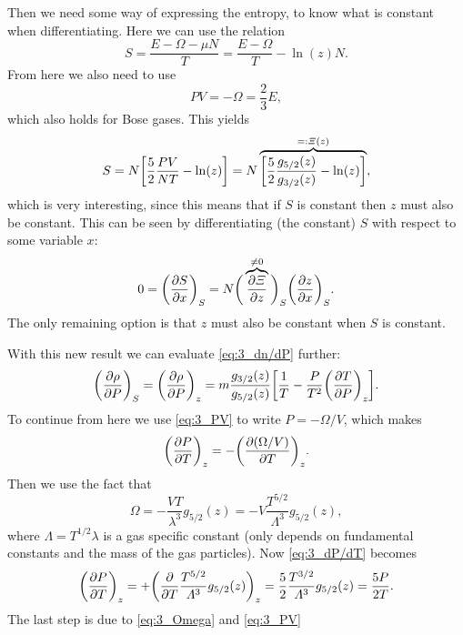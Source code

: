 \documentclass[11pt,letter, swedish, english
]{article}
\begin{document}
Then we need some way of expressing the entropy, to know what is
constant when differentiating. Here we can use the relation
\begin{equation}\label{eq:3_S}
S=\frac{E-\Omega-\mu N}{T}=\frac{E-\Omega}{T}-\ln(z)N.
\end{equation}
From here we also need to use
\begin{equation}\label{eq:3_PV}
PV=-\Omega=\frac{2}{3}E,
\end{equation}
which also holds for Bose gases. This yields
\vspace{-4mm}\begin{equation}
S=N\qty[\frac{5}{2}\frac{PV}{NT}-\ln(z)]=
N\overbrace{\qty[\frac{5}{2}\frac{g_{5/2}(z)}{g_{3/2}(z)}-\ln(z)]}^{=:\varXi(z)},
\end{equation}
which is very interesting, since this means that if $S$ is constant
then $z$ must also be constant\footnotemark{}. This can be seen by
differentiating (the constant) $S$ with respect to some variable $x$: 
\begin{equation}
0=\qty(\pdv{S}{x})_S=N\bigg(\overbrace{\pdv{\varXi}{z}}^{\neq0}\bigg)_S
\qty(\pdv{z}{x})_S.
\end{equation}
The only remaining option is that $z$ must also be constant when $S$
is constant.

With this new result we can evaluate \eqref{eq:3_dn/dP} further:
\begin{equation}\label{eq:3_drho/dP}
\qty(\pdv{\rho}{P})_S=\qty(\pdv{\rho}{P})_z
=m\frac{g_{3/2}(z)}{g_{5/2}(z)}
\qty[\frac{1}{T}-\frac{P}{T^2}\qty(\pdv{T}{P})_z].
\end{equation}
To continue from here we use \eqref{eq:3_PV} to write $P=-\Omega/V$,
which makes
\begin{equation}\label{eq:3_dP/dT}
\qty(\pdv{P}{T})_z=-\qty(\pdv{(\Omega/V)}{T})_z.
\end{equation}
Then we use the fact that
\begin{equation}\label{eq:3_Omega}
\Omega=-\frac{VT}{\lambda^3}g_{5/2}(z)
=-V\frac{T^{5/2}}{\varLambda^3}g_{5/2}(z),
\end{equation}
where $\Lambda=T^{1/2}\lambda$ is a gas specific constant (only
depends on fundamental constants and the mass of the gas particles).
Now \eqref{eq:3_dP/dT} becomes
\begin{equation}
\qty(\pdv{P}{T})_z
=+\qty(\pdv{T}\frac{T^{5/2}}{\varLambda^3}g_{5/2}(z))_z
=\frac{5}{2}\frac{T^{3/2}}{\varLambda^3}g_{5/2}(z)
=\frac{5P}{2T}.
\end{equation}
The last step is due to \eqref{eq:3_Omega} and \eqref{eq:3_PV}
\end{document}
